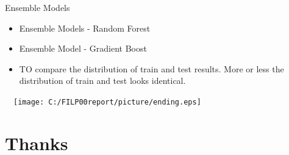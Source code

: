 \documentclass[
 size=14pt,
 paper=smartboard,  %
 mode=present, 		%
 display=slides, 	%
 style=tuliplab,  	%
 pauseslide,
 fleqn,leqno]{powerdot}
\begin{document}
\begin{slide}[toc=,bm=]{Ensemble Models}
\begin{itemize}
\item
Ensemble Models - Random Forest
\item
Ensemble Model - Gradient Boost
\item
TO compare the distribution of train and test results. More or less the distribution of train and test looks identical.
\end{itemize}
\begin{center}
  \texttt{[image: C:/FILP00report/picture/ending.eps]}
\end{center}
\end{slide}
\section{Thanks}
\end{document}
